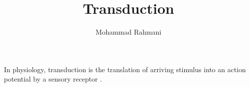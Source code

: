 \documentclass[a4paper]{article}
\title{Transduction}
\date{}
\author{Mohammad Rahmani}
\begin{document}
\maketitle
    In physiology, transduction is the translation of arriving stimulus into an action potential by a sensory receptor .
    
    
\end{document}
